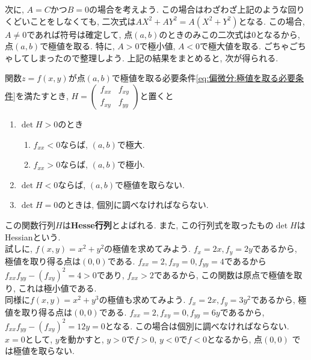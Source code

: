 \documentclass[a4j,dvipdfmx]{jsarticle}
\numberwithin{equation}{section}
\begin{document}
            次に, $A=C$かつ$B=0$の場合を考えよう. この場合はわざわざ上記のような回りくどいことをしなくても, 二次式は$AX^2+AY^2=A(X^2+Y^2)$となる.
            この場合, $A\neq 0$であれば符号は確定して, 点$(a,b)$のときのみこの二次式は0となるから, 点$(a,b)$で極値を取る. 特に, $A>0$で極小値, $A<0$で極大値を取る.
            \clearpage
            ごちゃごちゃしてしまったので整理しよう. 上記の結果をまとめると, 次が得られる.
            \begin{screen}
                関数$z=f(x,y)$が点$(a,b)$で極値を取る必要条件\eqref{eq:偏微分:極値を取る必要条件}を満たすとき, $H=\begin{pmatrix}f_{xx}&f_{xy}\\f_{xy}&f_{yy}\end{pmatrix}$と置くと
                \begin{enumerate}\renewcommand{\theenumi}{\roman{enumi}}\renewcommand{\labelenumi}{(\theenumi)}
                    \item $\det H > 0$のとき
                    \begin{enumerate}
                        \item $f_{xx}<0$ならば, $(a,b)$で極大.
                        \item $f_{xx}>0$ならば, $(a,b)$で極小.
                    \end{enumerate}
                    \item $\det H < 0$ならば, $(a,b)$で極値を取らない.
                    \item $\det H = 0$のときは, 個別に調べなければならない.
                \end{enumerate}
            \end{screen}
            この関数行列$H$は\textbf{Hesse行列}とよばれる. また, この行列式を取ったもの$\det H$はHessianという.\\

            試しに, $f(x,y)=x^2+y^2$の極値を求めてみよう. $f_x=2x,f_y=2y$であるから, 極値を取り得る点は$(0,0)$である. $f_{xx}=2,f_{xy}=0,f_{yy}=4$であるから
            $f_{xx}f_{yy}-(f_{xy})^2=4>0$であり, $f_{xx}>2$であるから, この関数は原点で極値を取り, これは極小値である.\\
            同様に$f(x,y)=x^2+y^3$の極値も求めてみよう. $f_{x}=2x,f_{y}=3y^2$であるから, 極値を取り得る点は$(0,0)$である. $f_{xx}=2,f_{xy}=0,f_{yy}=6y$であるから, 
            $f_{xx}f_{yy}-(f_{xy})^{2}=12y=0$となる. この場合は個別に調べなければならない. $x=0$として, $y$を動かすと, $y>0$で$f>0$, $y<0$で$f<0$となるから, 点$(0,0)$
            では極値を取らない.\\
\end{document}
